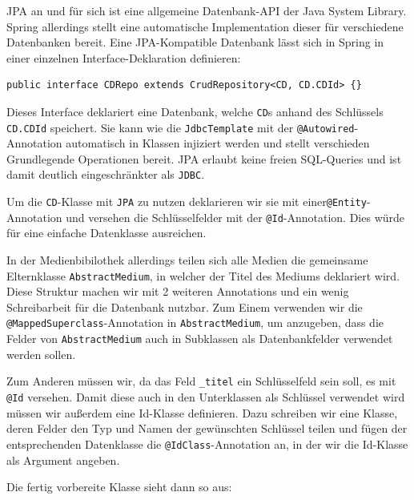 \documentclass{article}
\begin{document}
JPA an und für sich ist eine allgemeine Datenbank-API der Java System Library.
Spring allerdings stellt eine automatische Implementation dieser für verschiedene Datenbanken bereit.
Eine JPA-Kompatible Datenbank lässt sich in Spring in einer einzelnen Interface-Deklaration definieren:

\begin{lstlisting}
public interface CDRepo extends CrudRepository<CD, CD.CDId> {}
\end{lstlisting}

Dieses Interface deklariert eine Datenbank, welche \texttt{CD}s anhand des Schlüssels \texttt{CD.CDId} speichert.
Sie kann wie die \texttt{JdbcTemplate} mit der \texttt{@Autowired}-Annotation automatisch in Klassen injiziert werden und stellt verschieden Grundlegende Operationen bereit.
JPA erlaubt keine freien SQL-Queries und ist damit deutlich eingeschränkter als \texttt{JDBC}.

Um die \texttt{CD}-Klasse mit \texttt{JPA} zu nutzen deklarieren wir sie mit einer\texttt{@Entity}-Annotation und versehen die Schlüsselfelder mit der \texttt{@Id}-Annotation.
Dies würde für eine einfache Datenklasse ausreichen.

In der Medienbibilothek allerdings teilen sich alle Medien die gemeinsame Elternklasse \texttt{AbstractMedium}, in welcher der Titel des Mediums deklariert wird.
Diese Struktur machen wir mit 2 weiteren Annotations und ein wenig Schreibarbeit für die Datenbank nutzbar.
Zum Einem verwenden wir die \texttt{@MappedSuperclass}-Annotation in \texttt{AbstractMedium}, um anzugeben, dass die Felder von \texttt{AbstractMedium} auch in Subklassen als Datenbankfelder verwendet werden sollen.

Zum Anderen müssen wir, da das Feld \texttt{\_titel} ein Schlüsselfeld sein soll, es mit \texttt{@Id} versehen.
Damit diese auch in den Unterklassen als Schlüssel verwendet wird müssen wir außerdem eine Id-Klasse definieren.
Dazu schreiben wir eine Klasse, deren Felder den Typ und Namen der gewünschten Schlüssel teilen und fügen der entsprechenden Datenklasse die \texttt{@IdClass}-Annotation an, in der wir die Id-Klasse als Argument angeben.

Die fertig vorbereite Klasse sieht dann so aus:
\end{document}
